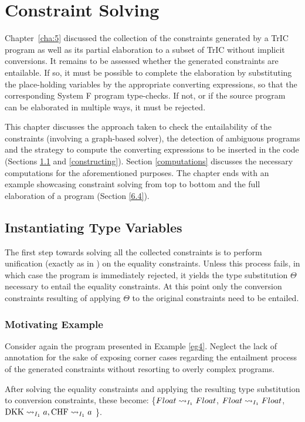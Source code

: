 \chapter{Constraint Solving}
\label{cha:6}

Chapter~\ref{cha:5} discussed the collection of the constraints generated by a TrIC program as well as its partial elaboration to a subset of TrIC without implicit conversions. It remains to be assessed whether the generated constraints are entailable. If so, it must be possible to complete the elaboration by substituting the place-holding variables by the appropriate converting expressions, so that the corresponding System F program type-checks. If not, or if the source program can be elaborated in multiple ways, it must be rejected.

This chapter discusses the approach taken to check the entailability of the constraints (involving a graph-based solver), the detection of ambiguous programs and the strategy to compute the converting expressions to be inserted in the code (Sections \ref{sc:cc} and \ref{constructing}). Section \ref{computations} discusses the necessary computations for the aforementioned purposes. The chapter ends with an example showcasing constraint solving from top to bottom and the full elaboration of a program (Section \ref{6.4}).


\section{Instantiating Type Variables}
\label{sc:cc}
The first step towards solving all the collected constraints is to perform unification (exactly as in ) on the equality constraints. Unless this process fails, in which case the program is immediately rejected, it yields the type substitution $\Theta$ necessary to entail the equality constraints. At this point only the conversion constraints resulting of applying $\Theta$ to the original constraints need to be entailed.
\subsection{Motivating Example}
Consider again the program presented in Example \ref{eg4}. Neglect the lack of annotation for the sake of exposing corner cases regarding the entailment process of the generated constraints without resorting to overly complex programs.

After solving the equality constraints and applying the resulting type substitution to conversion constraints, these become: \{$\convX{\imEnv_1}{Float}{Float}$, $\convX{\imEnv_1}{Float}{Float}$, $\convX{\imEnv_1}{\text{DKK}}{a}, \convX{\imEnv_1}{\text{CHF}}{a}$ \}.

